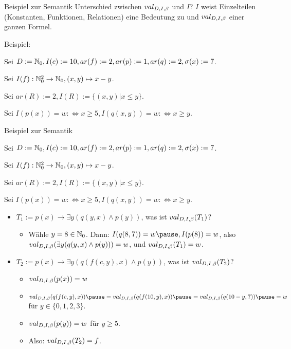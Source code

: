 \documentclass[handout]{beamer}
\begin{document}
\begin{frame}{Beispiel zur Semantik}
	Unterschied zwischen $val_{D,I,\beta}$ und $I$? \pause $I$ weist Einzelteilen (Konstanten, Funktionen, Relationen) eine Bedeutung zu und $val_{D,I,\beta}$ einer ganzen Formel.\pause\vertspace
	
	Beispiel:\vertspace\ip
	
	Sei $D := \mathbb{N}_0, I(c) := 10, ar(f) := 2, ar(p) := 1, ar(q) := 2, \sigma(x) := 7$.\ip
	
	Sei $I(f) : \mathbb{N}_0^2 \rightarrow \mathbb{N}_0, (x,y) \mapsto x-y$.\ip
	
	Sei $ar(R) := 2, I(R) := \{(x,y) | x \leq y\}$.\ip
	
	Sei $I(p(x)) = w :\Leftrightarrow x \geq 5, I(q(x,y)) = w :\Leftrightarrow x \geq y$.
\end{frame}

\begin{frame}{Beispiel zur Semantik}
	
	Sei $D := \mathbb{N}_0, I(c) := 10, ar(f) := 2, ar(p) := 1, ar(q) := 2, \sigma(x) := 7$.
	
	Sei $I(f) : \mathbb{N}_0^2 \rightarrow \mathbb{N}_0, (x,y) \mapsto x-y$.
	
	Sei $ar(R) := 2, I(R) := \{(x,y) | x \leq y\}$.
	
	Sei $I(p(x)) = w :\Leftrightarrow x \geq 5, I(q(x,y)) = w :\Leftrightarrow x \geq y$.
	
	\begin{itemize}
		\item $T_1 := p(x) \rightarrow \exists y (q(y,x) \land p(y))$, was ist $val_{D,I,\beta}(T_1)$?
		
		\pause
		\begin{itemize}
			\item Wähle $y = 8 \in \mathbb{N}_0$. \ip Dann: $I(q(8,7)) = w\ip, I(p(8)) = w$\ip, also $val_{D,I,\beta}(\exists y (q(y,x) \land p(y))) = w$\ip, und $val_{D,I,\beta}(T_1) = w$.
		\end{itemize}
		
		\pause
		
		\item $T_2 := p(x) \rightarrow \exists y (q(f(c,y), x) \land p(y))$, was ist $val_{D,I,\beta}(T_2)$?
		
		\pause
		\begin{itemize}
			\item $val_{D,I,\beta}(p(x)) = w$
			\ip\item $\pval(q(f(c,y), x)) \ip = \pval(q(f(10,y), x))\ip = \pval(q(10-y, 7))\ip = w$ für $y \in \{0,1,2,3\}$.
			\ip\item $val_{D,I,\beta}(p(y)) = w$ für $y \geq 5$.
			\ip\item Also: $val_{D,I,\beta}(T_2) = f$.
		\end{itemize}
	\end{itemize}
\end{frame}
\end{document}
